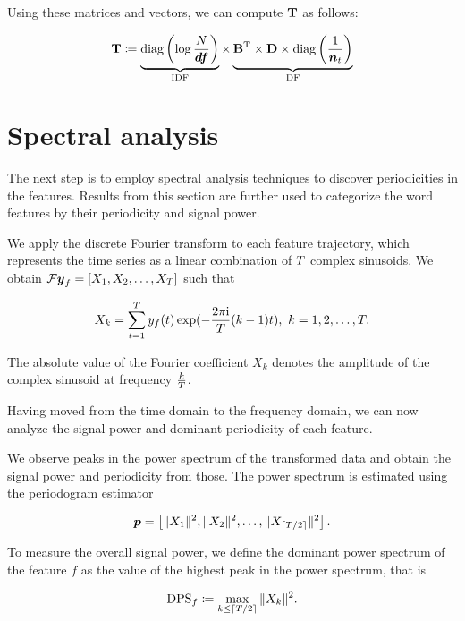 Using these matrices and vectors, we can compute $\mathbf{T}$ as follows:

\begin{equation}
	\trajmat \coloneqq
		\underbrace{\text{diag} \left( \log{\frac{\doccount}{\vect{\df}}} \right)}_{\text{IDF}}
		\times
		\underbrace{\bowmat^{\T}
		\times \dtdmat
		\times \text{diag} \left( \frac{1}{\vect{\doccount}_{t}} \right)}_{\text{DF}}
\end{equation}


\section{Spectral analysis}
The next step is to employ spectral analysis techniques to discover periodicities in the features. Results from this section are further used to categorize the word features by their periodicity and signal power.

We apply the discrete Fourier transform to each feature trajectory, which represents the time series as a linear combination of $T$ complex sinusoids. We obtain $\mathcal{F} \vect{\traj}_{f} = \left[ X_{1}, X_{2}, \dots, X_{\streamlen}\right ]$ such that

\begin{equation*}
	X_{k} = \sum_{t = 1}^{T}{y_{f}(t) \exp(- \frac{2 \pi \mathrm{i}}{T} (k - 1) t}), ~ k = 1, 2, \dots, T.
\end{equation*}

The absolute value of the Fourier coefficient $X_{k}$ denotes the amplitude of the complex sinusoid at frequency $\frac{k}{T}$.

Having moved from the time domain to the frequency domain, we can now analyze the signal power and dominant periodicity of each feature.

We observe peaks in the power spectrum of the transformed data and obtain the signal power and periodicity from those. The power spectrum is estimated using the periodogram estimator

\begin{equation*}
	\vect{P} = \left[ \|X_{1}\|^{2}, \|X_{2}\|^{2}, \dots, \|X_{\ceil{\streamlen / 2}}\|^{2} \right].
\end{equation*}

To measure the overall signal power, we define the dominant power spectrum of the feature $f$ as the value of the highest peak in the power spectrum, that is

\begin{equation}
	\text{DPS}_{f} \coloneqq \max\limits_{k \leq \lceil T / 2\rceil}{\|X_{k}\|^{2}}.
\end{equation}

